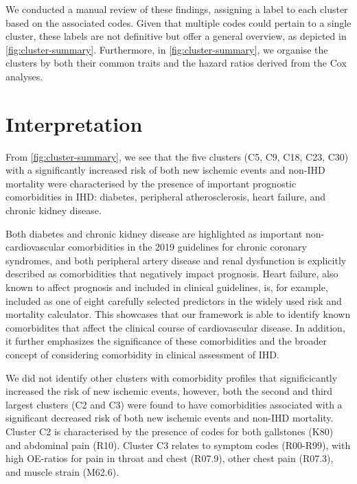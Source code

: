We conducted a manual review of these findings, assigning a label to each
cluster based on the associated codes. Given that multiple codes could pertain
to a single cluster, these labels are not definitive but offer a general
overview, as depicted in \cref{fig:cluster-summary}. 
Furthermore, in \cref{fig:cluster-summary}, we organise the
clusters by both their common traits and the hazard ratios 
derived from the Cox analyses.

\section{Interpretation}

From \cref{fig:cluster-summary}, 
we see that the five clusters (C5, C9, C18, C23, C30) with a 
significantly increased risk of both new ischemic events and non-\ac{IHD} mortality
were characterised by the presence of important prognostic comorbidities in \ac{IHD}:
diabetes, peripheral atherosclerosis, heart failure, 
and chronic kidney disease. 

Both diabetes and chronic kidney disease 
are highlighted as important non-cardiovascular
comorbidities in the 2019  guidelines for chronic coronary syndromes,
and both peripheral artery disease and renal dysfunction is explicitly
described as comorbidities that negatively impact prognosis.%
Heart failure, 
also known to affect prognosis and included in clinical guidelines,
is, for example, included as one of eight carefully selected predictors
in the widely used  risk and mortality calculator.%
This showcases that our framework is able to identify known comorbidites
that affect the clinical course of cardiovascular disease.
In addition, it further emphasizes the significance of these 
comorbidities and the broader concept of considering
comorbidity in clinical assessment of \ac{IHD}.

We did not identify other clusters with comorbidity profiles
that significicantly increased the risk of new ischemic events,
however, both the second and third largest clusters (C2 and C3)
were found to have comorbidities associated with a significant decreased risk
of both new ischemic events and non-\ac{IHD} mortality.
Cluster C2 is characterised by the presence of codes 
for both gallstones (K80) and abdominal pain (R10).
Cluster C3 relates to symptom codes (R00-R99),
with high \ac{OE}-ratios for
{pain in throat and chest} (R07.9), 
{other chest pain} (R07.3), 
and {muscle strain} (M62.6).

